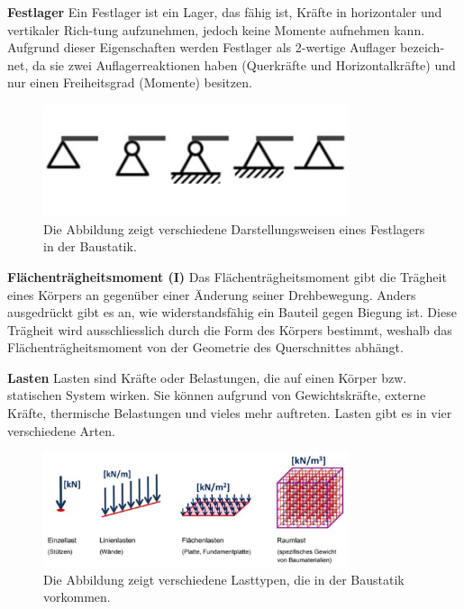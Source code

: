 \textbf{Festlager}
Ein Festlager ist ein Lager, das fähig ist, Kräfte in horizontaler und vertikaler Rich-tung aufzunehmen, jedoch keine Momente aufnehmen kann.
Aufgrund dieser Eigenschaften werden Festlager als 2-wertige Auflager bezeich-net, da sie zwei Auflagerreaktionen haben (Querkräfte und Horizontalkräfte) und nur einen Freiheitsgrad (Momente) besitzen.
\begin{figure} [h]
	\centering
	\includegraphics[width=0.8\textwidth]{papers/balken/images/teil1/Festlager.jpg}
	\caption{Die Abbildung zeigt verschiedene Darstellungsweisen eines Festlagers in der Baustatik.}
	\label{fig:Die Abbildung zeigt verschiedene Darstellungsweisen eines Festlagers in der Baustatik.}
\end{figure}

\textbf{Flächenträgheitsmoment (I)}
Das Flächenträgheitsmoment gibt die Trägheit eines Körpers an gegenüber einer Änderung seiner Drehbewegung.
Anders ausgedrückt gibt es an, wie widerstandsfähig ein Bauteil gegen Biegung ist.
Diese Trägheit wird ausschliesslich durch die Form des Körpers bestimmt, weshalb das Flächenträgheitsmoment von der Geometrie des Querschnittes abhängt.

\textbf{Lasten}
Lasten sind Kräfte oder Belastungen, die auf einen Körper bzw. statischen System wirken.
Sie können aufgrund von Gewichtskräfte, externe Kräfte, thermische Belastungen und vieles mehr auftreten.
Lasten gibt es in vier verschiedene Arten.
\begin{figure} [h]
	\centering
	\includegraphics[width=0.8\textwidth]{papers/balken/images/teil1/Lasten.jpg}
	\caption{Die Abbildung zeigt verschiedene Lasttypen, die in der Baustatik vorkommen.}
	\label{fig:Die Abbildung zeigt verschiedene Lasttypen, die in der Baustatik vorkommen.}
\end{figure}

